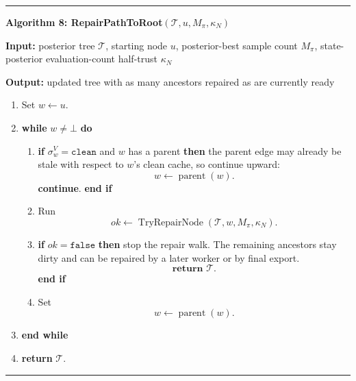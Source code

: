 \documentclass[11pt]{article}
\newcommand{\Tree}{\mathcal{T}}
\newcommand{\TryRepairNode}{\operatorname{TryRepairNode}}
\newenvironment{algorithmblock}[1]
{
  \par\medskip
  \noindent\hrule\par\smallskip
  \noindent\textbf{#1}
  \par\smallskip
}
{
  \par\smallskip\noindent\hrule\par\medskip
}
\newcommand{\Input}{\textbf{Input: }}
\newcommand{\Output}{\textbf{Output: }}
\newcommand{\Return}{\textbf{return }}
\newcommand{\If}{\textbf{if }}
\newcommand{\Then}{\textbf{ then }}
\newcommand{\EndIf}{\textbf{end if}}
\newcommand{\While}{\textbf{while }}
\newcommand{\EndWhile}{\textbf{end while}}
\newcommand{\Do}{\textbf{ do }}
\newcommand{\Continue}{\textbf{continue}}
\begin{document}
\begin{algorithmblock}{Algorithm 8: RepairPathToRoot\((\Tree,u,M_\pi,\kappa_N)\)}

\Input posterior tree \(\Tree\), starting node \(u\), posterior-best sample count \(M_\pi\), state-posterior evaluation-count half-trust \(\kappa_N\)

\Output updated tree with as many ancestors repaired as are currently ready

\begin{enumerate}[leftmargin=2em]
  \item Set \(w\gets u\).

  \item \While \(w\ne\bot\) \Do
  \begin{enumerate}[leftmargin=2em]
    \item \If \(\sigma^V_w=\texttt{clean}\) and \(w\) has a parent \Then
    the parent edge may already be stale with respect to \(w\)'s clean cache, so
    continue upward:
    \[
    w\gets\operatorname{parent}(w).
    \]
    \Continue.
    \EndIf

    \item Run
    \[
    ok\gets\TryRepairNode(\Tree,w,M_\pi,\kappa_N).
    \]

    \item \If \(ok=\texttt{false}\) \Then
    stop the repair walk. The remaining ancestors stay dirty and can be repaired
    by a later worker or by final export.
    \[
    \Return \Tree.
    \]
    \EndIf

    \item Set
    \[
    w\gets\operatorname{parent}(w).
    \]
  \end{enumerate}
  \item \EndWhile

  \item \Return \(\Tree\).
\end{enumerate}

\end{algorithmblock}
\end{document}
